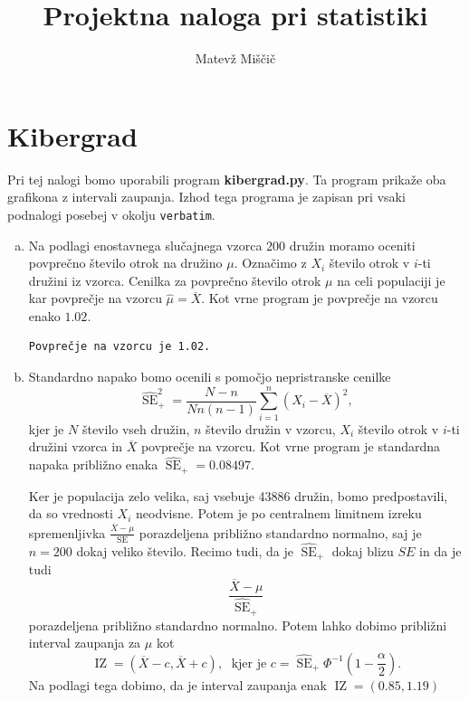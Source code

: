 \documentclass[a4paper,12pt]{article}
\title{Projektna naloga pri statistiki}
\author{Matevž Miščič}
\theoremstyle{definition}
\theoremstyle{plain}
\DeclareMathOperator*{\SE}{SE}
\DeclareMathOperator*{\IZ}{IZ}
\begin{document}
\maketitle{}

\section{Kibergrad}

Pri tej nalogi bomo uporabili program \textbf{kibergrad.py}. Ta program prikaže oba grafikona z intervali zaupanja. Izhod tega programa je zapisan pri vsaki podnalogi posebej v okolju \verb+verbatim+.

\begin{enumerate}[a)]
    \item Na podlagi enostavnega slučajnega vzorca $200$ družin moramo oceniti povprečno število otrok na družino $\mu$. Označimo z $X_i$ število otrok v $i$-ti družini iz vzorca. Cenilka za povprečno število otrok $\mu$ na celi populaciji je kar povprečje na vzorcu $\widehat{\mu} = \overline{X}$. Kot vrne program je povprečje na vzorcu enako $1.02$.
    
    \begin{verbatim}
Povprečje na vzorcu je 1.02.
    \end{verbatim}
    
    \item Standardno napako bomo ocenili s pomočjo nepristranske cenilke 
    $$\widehat{\SE}_{+}^2 = \frac{N - n}{Nn(n - 1)}\sum_{i = 1}^n (X_i - \overline{X})^2,$$ kjer je $N$ število vseh družin, $n$ število družin v vzorcu, $X_i$ število otrok v $i$-ti družini vzorca in $\overline{X}$ povprečje na vzorcu. Kot vrne program je standardna napaka približno enaka $\widehat{\SE}_{+} = 0.08497$.

    Ker je populacija zelo velika, saj vsebuje 43886 družin, bomo predpostavili, da so vrednosti $X_i$ neodvisne. Potem je po centralnem limitnem izreku spremenljivka $\frac{\overline{X} - \mu}{\SE}$ porazdeljena približno standardno normalno, saj je $n = 200$ dokaj veliko število. Recimo tudi, da je $\widehat{\SE}_{+}$ dokaj blizu $SE$ in da je tudi $$\frac{\overline{X} - \mu}{\widehat{\SE}_{+}}$$ porazdeljena približno standardno normalno. Potem lahko dobimo približni interval zaupanja za $\mu$ kot 
    $$\IZ = \left( \overline{X} - c, \overline{X} + c \right), \; \text{ kjer je } c = \widehat{\SE}_{+} \Phi^{-1}\left(1 - \frac{\alpha}{2}\right).$$
    Na podlagi tega dobimo, da je interval zaupanja enak $\IZ = \left( 0.85, 1.19 \right)$


\end{enumerate}
\end{document}
